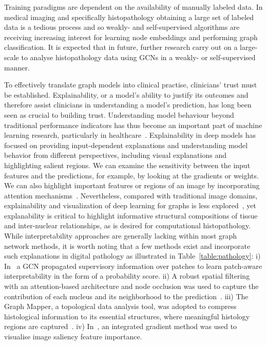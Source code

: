 Training paradigms are dependent on the availability of manually labeled data. In medical imaging and specifically histopathology obtaining a large set of labeled data is a tedious process and so weakly- and self-supervised algorithms are receiving increasing interest for learning node embeddings and performing graph classification. It is expected that in future, further research carry out on a large-scale to analyse histopathology data using GCNs in a weakly- or self-supervised manner. 
\vspace{-8pt}

To effectively translate graph models into clinical practise, clinicians' trust must be established. Explainability, or a model's ability to justify its outcomes and therefore assist clinicians in understanding a model's prediction, has long been seen as crucial to building trust. Understanding model behaviour beyond traditional performance indicators has thus become an important part of machine learning research, particularly in healthcare{~}.
Explainability in deep models has focused on providing input-dependent explanations and understanding model behavior from different perspectives, including visual explanations and highlighting salient regions. We can examine the sensitivity between the input features and the predictions, for example, by looking at the gradients or weights. We can also highlight important features or regions of an image by incorporating attention mechanisms{~}.
Nevertheless, compared with traditional image domains, explainability and visualization of deep learning for graphs is less explored{~}, yet explanability is critical to highlight informative structural compositions of tissue and inter-nuclear relationships, as is desired for computational histopathology.
While interpretability approaches are generally lacking within most graph network methods, it is worth noting that a few methods exist and incorporate such explanations in digital pathology as illustrated in Table~\ref{table:pathology}:
i) In~ a GCN propagated supervisory information over patches to learn patch-aware interpretability in the form of a probability score.
ii) A robust spatial filtering with an attention-based architecture and node occlusion was used to capture the contribution of each nucleus and its neighborhood to the prediction~.
iii) The Graph Mapper, a topological data analysis tool, was adopted to compress histological information to its essential structures, where meaningful histology regions are captured~.
iv) In~, an integrated gradient method was used to visualise image saliency feature importance.
